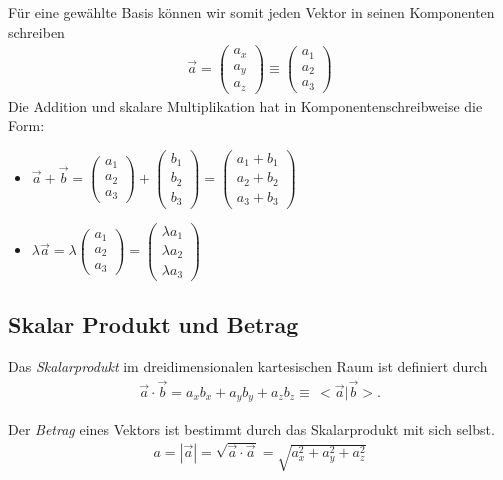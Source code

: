 Für eine gewählte Basis können wir somit jeden Vektor in seinen Komponenten schreiben
\begin{align}
 \vec a = \begin{pmatrix}a_x\\a_y\\a_z\end{pmatrix} \equiv \begin{pmatrix}a_1\\a_2\\a_3\end{pmatrix}
\end{align}
Die Addition und skalare Multiplikation hat in Komponentenschreibweise die Form:
\begin{itemize}
 \item $\vec a + \vec b = \begin{pmatrix}a_1\\a_2\\a_3\end{pmatrix} + \begin{pmatrix}b_1\\b_2\\b_3\end{pmatrix} = \begin{pmatrix}a_1+b_1\\a_2+b_2\\a_3+b_3\end{pmatrix}$
\item $\lambda  \vec a = \lambda \begin{pmatrix}a_1\\a_2\\a_3\end{pmatrix} = \begin{pmatrix}\lambda a_1\\ \lambda a_2\\ \lambda a_3\end{pmatrix}$
\end{itemize}

\subsection{Skalar Produkt und Betrag}
\begin{Definition}[Skalarprodukt]
Das {\em Skalarprodukt} im dreidimensionalen kartesischen Raum ist definiert durch
\begin{align}
 \vec a \cdot \vec b = a_x b_x + a_y b_y + a_z b_z \equiv\,<\vec a|\vec b>.
\end{align}
\end{Definition}
\begin{Definition}[Betrag]
Der {\em Betrag} eines Vektors ist bestimmt durch das Skalarprodukt mit sich selbst.
\begin{align}
 a = |\vec a| = \sqrt{\vec a \cdot \vec a} = \sqrt{a_x^2 + a_y^2 + a_z^2}
\end{align}
\end{Definition}

